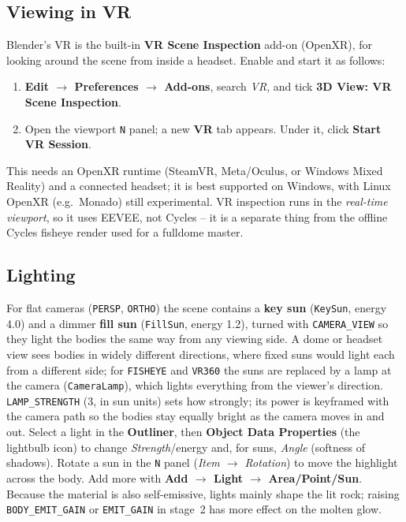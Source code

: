 \documentclass[11pt]{article}
\newcommand{\pc}[1]{\texttt{#1}}
\begin{document}
\subsection{Viewing in VR}
Blender's VR is the built-in \textbf{VR Scene Inspection} add-on (OpenXR), for
looking around the scene from inside a headset. Enable and start it as follows:
\begin{enumerate}
  \item \textbf{Edit $\rightarrow$ Preferences $\rightarrow$ Add-ons}, search
        \emph{VR}, and tick \textbf{3D View: VR Scene Inspection}.
  \item Open the viewport \pc{N} panel; a new \textbf{VR} tab appears. Under it,
        click \textbf{Start VR Session}.
\end{enumerate}
\noindent This needs an OpenXR runtime (SteamVR, Meta/Oculus, or Windows Mixed
Reality) and a connected headset; it is best supported on Windows, with Linux
OpenXR (e.g.\ Monado) still experimental. VR inspection runs in the
\emph{real-time viewport}, so it uses EEVEE, not Cycles -- it is a separate thing
from the offline Cycles fisheye render used for a fulldome master.
 
\subsection{Lighting}
For flat cameras (\pc{PERSP}, \pc{ORTHO}) the scene contains a \textbf{key sun} (\pc{KeySun}, energy 4.0) and a dimmer
\textbf{fill sun} (\pc{FillSun}, energy 1.2), turned with \pc{CAMERA\_VIEW} so they light the bodies the same way from any viewing side. A dome or headset view sees bodies in widely different directions, where fixed suns would light each from a different side; for \pc{FISHEYE} and \pc{VR360} the suns are replaced by a lamp at the camera (\pc{CameraLamp}), which lights everything from the viewer's direction. \pc{LAMP\_STRENGTH} (3, in sun units) sets how strongly; its power is keyframed with the camera path so the bodies stay equally bright as the camera moves in and out. Select a light in the
\textbf{Outliner}, then \textbf{Object Data Properties} (the lightbulb icon) to
change \emph{Strength}/energy and, for suns, \emph{Angle} (softness of
shadows). Rotate a sun in the \pc{N} panel (\emph{Item $\rightarrow$ Rotation})
to move the highlight across the body. Add more with \textbf{Add $\rightarrow$
Light $\rightarrow$ Area/Point/Sun}. Because the material is also self-emissive,
lights mainly shape the lit rock; raising \pc{BODY\_EMIT\_GAIN} or \pc{EMIT\_GAIN} in stage~2 has
more effect on the molten glow.
 
\end{document}
